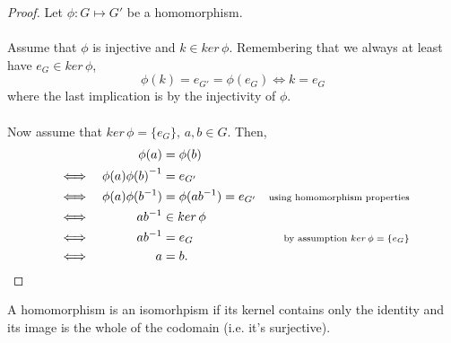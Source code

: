 \documentclass[MathsNotesBase.tex]{subfiles}
\begin{document}
{	
	\begin{proof}
		Let ${ \phi: G \longmapsto G' }$ be a homomorphism.\\\\
		Assume that $\phi$ is injective and ${ k \in ker\,\phi }$. Remembering that we always at least have ${ e_G \in ker\,\phi }$,
		\[ \phi(k) = e_{G'} = \phi(e_G) \iff k = e_G \]
		where the last implication is by the injectivity of $\phi$.\\\\
		Now assume that ${ ker\,\phi = \{e_G\},\, a,b \in G }$. Then,
		\begin{align*}
		&& \phi(a) &= \phi(b) &  \\
		&\iff & \phi(a){\phi(b)}^{-1} &= e_{G'} & \\
		&\iff & \phi(a)\phi({b}^{-1}) &= \phi(a{b}^{-1}) = e_{G'} &\text{\scriptsize{using homomorphism properties}} \\
		&\iff & a{b}^{-1} &\in ker\,\phi &\text{\scriptsize{}} \\
		&\iff & a{b}^{-1} &= e_G &\text{\scriptsize{by assumption ${ ker\,\phi = \{e_G\} }$}} \\
		&\iff & a &= b.  &\qedhere \\
		\end{align*}		
	\end{proof}
	
	\begin{corollary}
		A homomorphism is an isomorhpism if its kernel contains only the identity and its image is the whole of the codomain (i.e. it's surjective). 
	\end{corollary}

}
\end{document}
